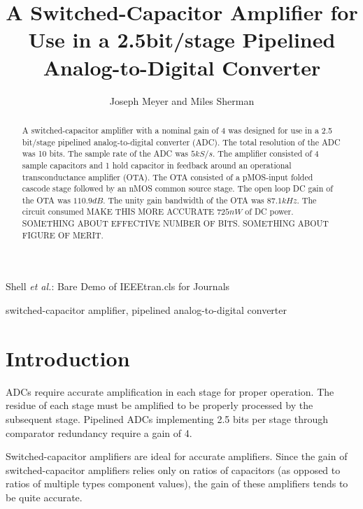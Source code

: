 \documentclass[journal]{IEEEtran}
\begin{document}
\title{A Switched-Capacitor Amplifier for Use in a 2.5bit/stage Pipelined Analog-to-Digital Converter }

\author{Joseph Meyer and Miles Sherman}

%
{Shell \MakeLowercase{\textit{et al.}}: Bare Demo of IEEEtran.cls for Journals}

\maketitle

\begin{abstract}
A switched-capacitor amplifier with a nominal gain of 4 was designed for use in a 2.5 bit/stage pipelined analog-to-digital converter (ADC). The total resolution of the ADC was 10 bits. The sample rate of the ADC was $5kS/s$. The amplifier consisted of 4 sample capacitors and 1 hold capacitor in feedback around an operational transconductance amplifier (OTA). The OTA consisted of a pMOS-input folded cascode stage followed by an nMOS common source stage. The open loop DC gain of the OTA was $110.9dB$. The unity gain bandwidth of the OTA was $87.1kHz$. The circuit consumed MAKE THIS MORE ACCURATE $725nW$ of DC power. SOMETHING ABOUT EFFECTIVE NUMBER OF BITS. SOMETHING ABOUT FIGURE OF MERIT.
\end{abstract}

\begin{IEEEkeywords}
switched-capacitor amplifier, pipelined analog-to-digital converter
\end{IEEEkeywords}

\section{Introduction}
 ADCs require accurate amplification in each stage for proper operation. The residue of each stage must be amplified to be properly processed by the subsequent stage. Pipelined ADCs implementing 2.5 bits per stage through comparator redundancy require a gain of 4. 

Switched-capacitor amplifiers are ideal for accurate amplifiers. Since the gain of switched-capacitor amplifiers relies only on ratios of capacitors (as opposed to ratios of multiple types component values), the gain of these amplifiers tends to be quite accurate.
\end{document}

